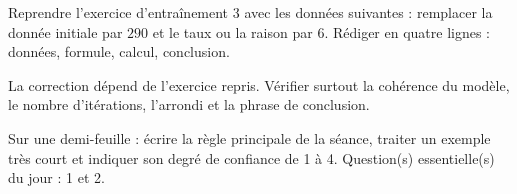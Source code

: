
\begin{homework}Reprendre l'exercice d'entraînement 3 avec les données suivantes : remplacer la donnée initiale par $290$ et le taux ou la raison par $6$. Rédiger en quatre lignes : données, formule, calcul, conclusion.\end{homework}
\begin{solution}La correction dépend de l'exercice repris. Vérifier surtout la cohérence du modèle, le nombre d'itérations, l'arrondi et la phrase de conclusion.\end{solution}

\begin{exitticket}[3 minutes]Sur une demi-feuille : écrire la règle principale de la séance, traiter un exemple très court et indiquer son degré de confiance de 1 à 4. Question(s) essentielle(s) du jour : 1 et 2.\end{exitticket}

